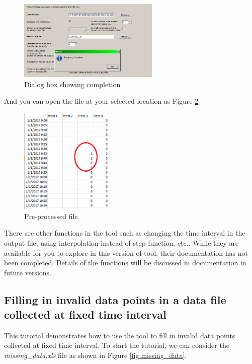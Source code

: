 \documentclass[12pt,a4paper]{article}
\begin{document}
\begin{figure}[H]
\centering
\includegraphics[width=0.6\textwidth]{complete.png}
\caption{Dialog box showing completion}
\label{fig:complete}
\end{figure}

And you can open the file at your selected location as Figure \ref{fig:step}

\begin{figure}[H]
\centering
\includegraphics[width=0.4\textwidth]{step.png}
\caption{Pre-processed file}
\label{fig:step}
\end{figure}

There are other functions in the tool such as changing the time interval in the output file, using interpolation instead of step function, etc..
While they are available for you to explore in this version of tool, their documentation has not been completed.
Details of the functions will be discussed in documentation in future versions.

\subsection{Filling in invalid data points in a data file collected at fixed time interval}
\label{sec:tutorial_invalid}

This tutorial demonstrates how to use the tool to fill in invalid data points collected at fixed time interval.
To start the tutorial, we can consider the \emph{missing\_data.xls} file as shown in Figure \ref{fig:missing_data}.
\end{document}
